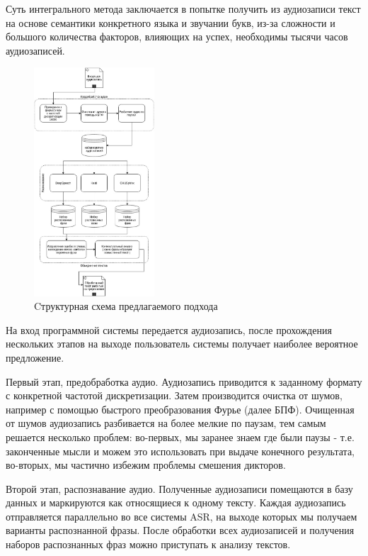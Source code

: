 \documentclass[conference]{IEEEtran}
\begin{document}
Суть интегрального метода заключается в попытке получить из аудиозаписи текст на основе семантики конкретного языка и звучании букв, из-за сложности и большого количества факторов, влияющих на успех, необходимы тысячи часов аудиозаписей.

\begin{figure}[h]
\centering
\includegraphics[width=0.4\textwidth]{./Diagram1.jpg}
\caption{Cтруктурная схема предлагаемого подхода}
\label{fig:Panel}
\end{figure}

На вход программной системы передается аудиозапись, после прохождения нескольких этапов на выходе пользователь системы получает наиболее вероятное предложение.

Первый этап, предобработка аудио. Аудиозапись приводится к заданному формату с конкретной частотой дискретизации. Затем производится очистка от шумов, например с помощью быстрого преобразования Фурье (далее БПФ). Очищенная от шумов аудиозапись разбивается на более мелкие по паузам, тем самым решается несколько проблем: во-первых, мы заранее знаем где были паузы - т.е. законченные мысли и можем это использовать при выдаче конечного результата, во-вторых, мы частично избежим проблемы смешения дикторов.

Второй этап, распознавание аудио. Полученные аудиозаписи помещаются в базу данных и маркируются как относящиеся к одному тексту. Каждая аудиозапись отправляется параллельно во все системы ASR, на выходе которых мы получаем варианты распознанной фразы. После обработки всех аудиозаписей и получения наборов распознанных фраз можно приступать к анализу текстов.
\end{document}
